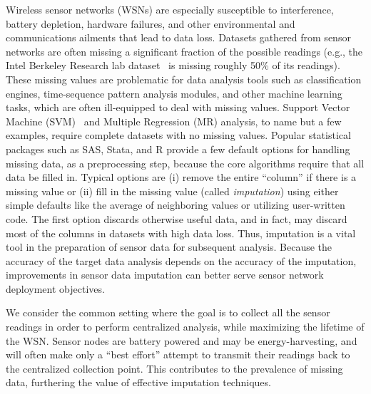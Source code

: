 
Wireless sensor networks (WSNs) are especially susceptible to interference,
battery depletion, hardware failures, and other environmental and communications ailments
that lead to data loss.  Datasets gathered from sensor networks are
often missing a significant fraction of the possible readings
(e.g., the Intel Berkeley Research lab dataset~\cite{berkeley2004lab}
is missing roughly 50\% of its readings).
These missing values are problematic for data analysis tools such as
classification engines, time-sequence pattern analysis modules, and
other machine learning tasks, which are often ill-equipped to deal
with missing values.  Support Vector Machine
(SVM)~\cite{vapnik2000nature} and Multiple Regression (MR) analysis,
to name but a few examples, require complete datasets with no missing
values.  Popular statistical packages such as SAS, Stata, and R
provide a few default options for handling missing data, as a
preprocessing step, because the core algorithms require that all data be filled
in.  Typical options are (i) remove the entire ``column'' if there is a
missing value or (ii) fill in the missing value (called {\em
imputation}) using either simple defaults like the average of
neighboring values or utilizing user-written code.  The first option discards
otherwise useful data, and in fact, may discard most of the columns in
datasets with high data loss.  Thus, imputation is a vital tool in the
preparation of sensor data for subsequent analysis. Because the
accuracy of the target data analysis depends on the accuracy of the
imputation, improvements in sensor data imputation can better serve
sensor network deployment objectives.

We consider the common setting where the goal is to collect all the sensor readings
in order to perform centralized analysis, while maximizing the lifetime of the WSN.
Sensor nodes are battery powered and may be energy-harvesting, and will often make
only a ``best effort'' attempt to transmit their readings back to the centralized 
collection point.  This contributes to the prevalence of missing data, furthering
the value of effective imputation techniques.


